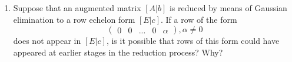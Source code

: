 \begin{enumerate}[leftmargin=*, label=\bfseries 2.3.\arabic*]
\item Suppose that an augmented matrix \([A|b]\) is reduced by means of Gaussian elimination to a row echelon form \([E|c]\). If a row of the form 
\[
\left(\begin{array}{cccc|c}
    0 & 0 & ... & 0 & \alpha
\end{array}\right), \alpha \neq 0
\]
does not appear in \([E|c]\), is it possible that rows of this form could have appeared at earlier stages in the reduction process? Why?

\end{enumerate}
